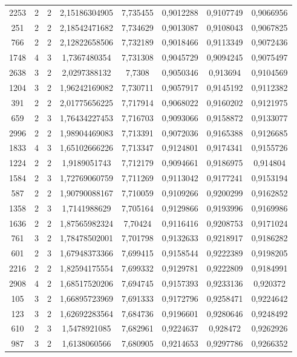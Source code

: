 \begin{longtable}{|c|c|c|c|c|c|c|c|}
2253 & 2 & 2 & 2,15186304905 & 7,735455 & 0,9012288 & 0,9107749 & 0,9066956 \\
251 & 2 & 2 & 2,18542471682 & 7,734629 & 0,9013087 & 0,9108043 & 0,9067825 \\
766 & 2 & 2 & 2,12822658506 & 7,732189 & 0,9018466 & 0,9113349 & 0,9072436 \\
1748 & 4 & 3 & 1,7367480354 & 7,731308 & 0,9045729 & 0,9094245 & 0,9075497 \\
2638 & 3 & 2 & 2,0297388132 & 7,7308 & 0,9050346 & 0,913694 & 0,9104569 \\
1204 & 3 & 2 & 1,96242169082 & 7,730711 & 0,9057917 & 0,9145192 & 0,9112382 \\
391 & 2 & 2 & 2,01775656225 & 7,717914 & 0,9068022 & 0,9160202 & 0,9121975 \\
659 & 2 & 3 & 1,76434227453 & 7,716703 & 0,9093066 & 0,9158872 & 0,9133077 \\
2996 & 2 & 2 & 1,98904469083 & 7,713391 & 0,9072036 & 0,9165388 & 0,9126685 \\
1833 & 4 & 3 & 1,65102666226 & 7,713347 & 0,9124801 & 0,9174341 & 0,9155726 \\
1224 & 2 & 2 & 1,9189051743 & 7,712179 & 0,9094661 & 0,9186975 & 0,914804 \\
1584 & 2 & 3 & 1,72769060759 & 7,711269 & 0,9113042 & 0,9177241 & 0,9153194 \\
587 & 2 & 2 & 1,90790088167 & 7,710059 & 0,9109266 & 0,9200299 & 0,9162852 \\
1358 & 2 & 3 & 1,7141988629 & 7,705164 & 0,9129866 & 0,9193996 & 0,9169986 \\
1636 & 2 & 2 & 1,87565982324 & 7,70424 & 0,9116416 & 0,9208753 & 0,9171024 \\
761 & 3 & 2 & 1,78478502001 & 7,701798 & 0,9132633 & 0,9218917 & 0,9186282 \\
601 & 2 & 3 & 1,67948373366 & 7,699415 & 0,9158544 & 0,9222389 & 0,9198205 \\
2216 & 2 & 2 & 1,82594175554 & 7,699332 & 0,9129781 & 0,9222809 & 0,9184991 \\
2908 & 4 & 2 & 1,68517520206 & 7,694745 & 0,9157393 & 0,9233136 & 0,920372 \\
105 & 3 & 2 & 1,66895723969 & 7,691333 & 0,9172796 & 0,9258471 & 0,9224642 \\
123 & 3 & 2 & 1,62692283564 & 7,684736 & 0,9196601 & 0,9280646 & 0,9248492 \\
610 & 2 & 3 & 1,5478921085 & 7,682961 & 0,9224637 & 0,928472 & 0,9262926 \\
987 & 3 & 2 & 1,6138060566 & 7,680905 & 0,9214653 & 0,9297786 & 0,9266352 \\

\end{longtable}
